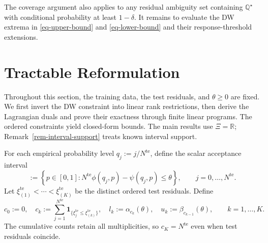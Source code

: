 \documentclass[review,11pt,3p,authoryear,nopreprintline]{elsarticle}
\begin{document}
The coverage argument also applies to any residual ambiguity set containing $\mathbb Q^\star$ with conditional probability at least $1-\delta$. It remains to evaluate the DW extrema in \eqref{eq-upper-bound} and \eqref{eq-lower-bound} and their response-threshold extensions.


\section{Tractable Reformulation}
\label{sec-reformulation}

Throughout this section, the training data, the test residuals, and $\theta\ge0$ are fixed. We first invert the DW constraint into linear rank restrictions, then derive the Lagrangian duals and prove their exactness through finite linear programs. The ordered constraints yield closed-form bounds. The main results use $\Xi=\mathbb R$; Remark~\ref{rem-interval-support} treats known interval support.

For each empirical probability level $q_j:=j/N^{\mathrm{te}}$, define the scalar acceptance interval
\begin{equation}
  [\alpha_j(\theta),\beta_j(\theta)]
  :=\left\{p\in[0,1]:
  N^{\mathrm{te}}\phi(q_j,p)-\psi(q_j,p)\le\theta\right\},
  \qquad j=0,\ldots,N^{\mathrm{te}}.
  \label{eq-dw-rank-acceptance}
\end{equation}
Let $\xi_{(1)}^{\mathrm{te}}<\cdots<\xi_{(K)}^{\mathrm{te}}$ be the distinct ordered test residuals. Define
\begin{equation} 
    c_0 :=0, \quad
    c_k :=\sum_{j=1}^{N^{\mathrm{te}}}\mathbf1_{\{\xi_j^{\mathrm{te}}\le\xi_{(k)}^{\mathrm{te}}\}}, \quad
    l_k :=\alpha_{c_k}(\theta),  \quad
    u_k :=\beta_{c_{k-1}}(\theta),\qquad k=1,\ldots,K.
  \label{eq-dw-counts-and-levels}
\end{equation}
The cumulative counts retain all multiplicities, so $c_K=N^{\mathrm{te}}$ even when test residuals coincide.
\end{document}
